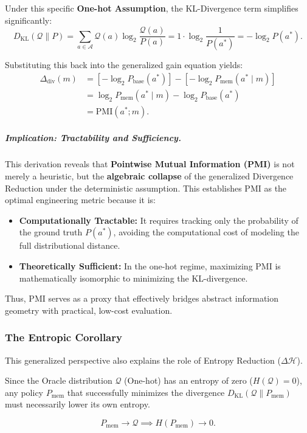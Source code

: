 Under this specific \textbf{One-hot Assumption}, the KL-Divergence term simplifies significantly:
\[
D_{\text{KL}}(\mathcal{Q} \parallel P) 
= \sum_{a \in \mathcal{A}} \mathcal{Q}(a) \log_2 \frac{\mathcal{Q}(a)}{P(a)}
= 1 \cdot \log_2 \frac{1}{P(a^*)}
= -\log_2 P(a^*).
\]

Substituting this back into the generalized gain equation yields:
\[
\begin{aligned}
\Delta_{\text{div}}(m) 
&= \left[ -\log_2 P_{\text{base}}(a^*) \right] - \left[ -\log_2 P_{\text{mem}}(a^* \mid m) \right] \\
&= \log_2 P_{\text{mem}}(a^* \mid m) - \log_2 P_{\text{base}}(a^*) \\
&= \mathrm{PMI}(a^*; m).
\end{aligned}
\]

\subparagraph{Implication: Tractability and Sufficiency.}
This derivation reveals that \textbf{Pointwise Mutual Information (PMI)} is not merely a heuristic, but the \textbf{algebraic collapse} of the generalized Divergence Reduction under the deterministic assumption. This establishes PMI as the optimal engineering metric because it is:
\begin{itemize}
    \item \textbf{Computationally Tractable:} It requires tracking only the probability of the ground truth $P(a^*)$, avoiding the computational cost of modeling the full distributional distance.
    \item \textbf{Theoretically Sufficient:} In the one-hot regime, maximizing PMI is mathematically isomorphic to minimizing the KL-divergence.
\end{itemize}
Thus, PMI serves as a proxy that effectively bridges abstract information geometry with practical, low-cost evaluation.

\subsubsection{The Entropic Corollary}

This generalized perspective also explains the role of Entropy Reduction ($\Delta \mathcal{H}$). 

Since the Oracle distribution $\mathcal{Q}$ (One-hot) has an entropy of zero ($H(\mathcal{Q}) = 0$), any policy $P_{\text{mem}}$ that successfully minimizes the divergence $D_{\text{KL}}(\mathcal{Q} \parallel P_{\text{mem}})$ must necessarily lower its own entropy.

\[
P_{\text{mem}} \to \mathcal{Q} \implies H(P_{\text{mem}}) \to 0.
\]

